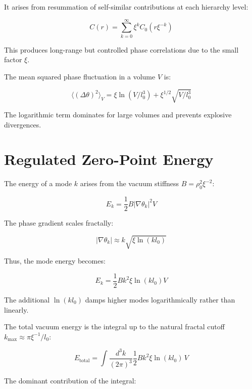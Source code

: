 	It arises from resummation of self-similar contributions at each hierarchy level:
	
	\begin{equation}
		C(r) = \sum_{k=0}^\infty \xi^k C_0(r \xi^{-k})
	\end{equation}
	
	This produces long-range but controlled phase correlations due to the small factor $\xi$.
	
	The mean squared phase fluctuation in a volume $V$ is:
	
	\begin{equation}
		\langle (\Delta \theta)^2 \rangle_V = \xi \ln(V / l_0^3) + \xi^{1/2} \sqrt{V / l_0^3}
	\end{equation}
	
	The logarithmic term dominates for large volumes and prevents explosive divergences.
	
	\section*{Regulated Zero-Point Energy}
	
	The energy of a mode $k$ arises from the vacuum stiffness $B = \rho_0^2 \xi^{-2}$:
	
	\begin{equation}
		E_k = \frac{1}{2} B |\nabla \theta_k|^2 V
	\end{equation}
	
	The phase gradient scales fractally:
	
	\begin{equation}
		|\nabla \theta_k| \approx k \sqrt{\xi \ln(k l_0)}
	\end{equation}
	
	Thus, the mode energy becomes:
	
	\begin{equation}
		E_k = \frac{1}{2} B k^2 \xi \ln(k l_0) V
	\end{equation}
	
	The additional $\ln(k l_0)$ damps higher modes logarithmically rather than linearly.
	
	The total vacuum energy is the integral up to the natural fractal cutoff $k_{\max} \approx \pi \xi^{-1} / l_0$:
	
	\begin{equation}
		E_{\text{total}} = \int \frac{d^3k}{(2\pi)^3} \frac{1}{2} B k^2 \xi \ln(k l_0) \, V
	\end{equation}
	
	The dominant contribution of the integral:
	
